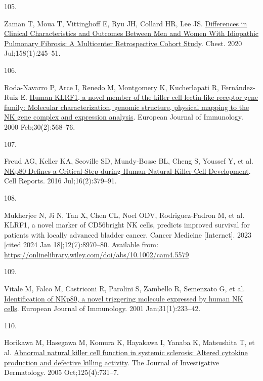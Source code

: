 \documentclass[
]{article}
\newlength{\cslhangindent}
\newlength{\csllabelwidth}
\newlength{\cslentryspacingunit} %
\newenvironment{CSLReferences}[2] %
 {%
  \setlength{\parindent}{0pt}
  \ifodd #1
  \let\oldpar\par
  \def\par{\hangindent=\cslhangindent\oldpar}
  \fi
  \setlength{\parskip}{#2\cslentryspacingunit}
 }%
 {}
\newcommand{\CSLLeftMargin}[1]{\parbox[t]{\csllabelwidth}{#1}}
\newcommand{\CSLRightInline}[1]{\parbox[t]{\linewidth - \csllabelwidth}{#1}\break}
\begin{document}
\begin{CSLReferences}{0}{0}
\leavevmode{}%
\CSLLeftMargin{105. }%
\CSLRightInline{Zaman T, Moua T, Vittinghoff E, Ryu JH, Collard HR, Lee JS. \href{https://doi.org/10.1016/j.chest.2020.02.009}{Differences in {Clinical} {Characteristics} and {Outcomes} {Between} {Men} and {Women} {With} {Idiopathic} {Pulmonary} {Fibrosis}: {A} {Multicenter} {Retrospective} {Cohort} {Study}}. Chest. 2020 Jul;158(1):245--51. }

\leavevmode{}%
\CSLLeftMargin{106. }%
\CSLRightInline{Roda-Navarro P, Arce I, Renedo M, Montgomery K, Kucherlapati R, Fernández-Ruiz E. \href{https://doi.org/10.1002/1521-4141(200002)30:2\%3C568::AID-IMMU568\%3E3.0.CO;2-Y}{Human {KLRF1}, a novel member of the killer cell lectin-like receptor gene family: Molecular characterization, genomic structure, physical mapping to the {NK} gene complex and expression analysis}. European Journal of Immunology. 2000 Feb;30(2):568--76. }

\leavevmode{}%
\CSLLeftMargin{107. }%
\CSLRightInline{Freud AG, Keller KA, Scoville SD, Mundy-Bosse BL, Cheng S, Youssef Y, et al. \href{https://doi.org/10.1016/j.celrep.2016.05.095}{{NKp80} {Defines} a {Critical} {Step} during {Human} {Natural} {Killer} {Cell} {Development}}. Cell Reports. 2016 Jul;16(2):379--91. }

\leavevmode{}%
\CSLLeftMargin{108. }%
\CSLRightInline{Mukherjee N, Ji N, Tan X, Chen CL, Noel ODV, Rodriguez-Padron M, et al. {KLRF1}, a novel marker of {CD56bright} {NK} cells, predicts improved survival for patients with locally advanced bladder cancer. Cancer Medicine {[}Internet{]}. 2023 {[}cited 2024 Jan 18{]};12(7):8970--80. Available from: \url{https://onlinelibrary.wiley.com/doi/abs/10.1002/cam4.5579}}

\leavevmode{}%
\CSLLeftMargin{109. }%
\CSLRightInline{Vitale M, Falco M, Castriconi R, Parolini S, Zambello R, Semenzato G, et al. \href{https://doi.org/10.1002/1521-4141(200101)31:1\%3C233::AID-IMMU233\%3E3.0.CO;2-4}{Identification of {NKp80}, a novel triggering molecule expressed by human {NK} cells}. European Journal of Immunology. 2001 Jan;31(1):233--42. }

\leavevmode{}%
\CSLLeftMargin{110. }%
\CSLRightInline{Horikawa M, Hasegawa M, Komura K, Hayakawa I, Yanaba K, Matsushita T, et al. \href{https://doi.org/10.1111/j.0022-202X.2005.23767.x}{Abnormal natural killer cell function in systemic sclerosis: Altered cytokine production and defective killing activity}. The Journal of Investigative Dermatology. 2005 Oct;125(4):731--7. }


\end{CSLReferences}
\end{document}
